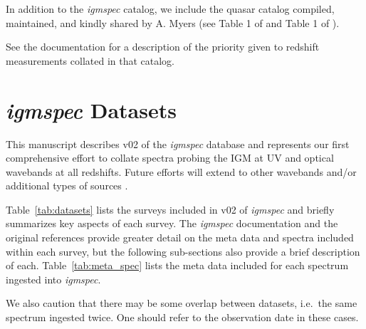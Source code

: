 \documentclass[12pt]{elsarticle}
\begin{document}
In addition to the {\it igmspec} catalog, we include the quasar
catalog  compiled, maintained, and kindly shared by A. Myers 
(see Table 1 of \cite{peters+15}
and Table 1 of \cite{richards+15}). 

See the documentation for a description of the priority given to 
redshift measurements collated in that catalog.


\section{{\it igmspec} Datasets}
\label{sec:datasets}

This manuscript describes v02 of the {\it igmspec}
database and represents our first comprehensive effort to collate
spectra probing the IGM at UV and optical wavebands at all
redshifts.  Future efforts will extend to other wavebands and/or
additional types of sources 
\citep[e.g. star-forming galaxies;][]{rpk+10,rubin+16}.

Table~\ref{tab:datasets} lists the surveys included in
v02 of {\it igmspec} and briefly summarizes key aspects
of each survey.  The {\it igmspec} documentation and 
the original references provide greater detail on the meta data
and spectra included within each survey, but the following
sub-sections also provide a brief description of each.
Table~\ref{tab:meta_spec} lists the meta data included
for each spectrum ingested into {\it igmspec}.

We also caution that there may be some overlap between
datasets, i.e.\ the same spectrum ingested twice.  One
should refer to the observation date in these cases.


\end{document}
